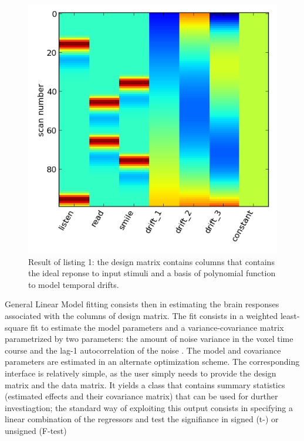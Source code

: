 \documentclass{bioinfo}
\begin{document}
\begin{widetext}

\end{widetext}
\begin{figure}
\includegraphics[width=.9\linewidth]{dmtx.png}
\caption{ Result of listing 1: the design matrix contains columns that
  contains the ideal reponse to input stimuli and a basis of
  polynomial function to model temporal drifts.}
\end{figure}


General Linear Model fitting consists then in estimating the brain
responses associated with the columns of design matrix.
%
The fit consists in a weighted least-square fit to estimate the model
parameters and a variance-covariance matrix parametrized by two
parameters: the amount of noise variance in the voxel time course and
the lag-1 autocorrelation of the noise \cite{Bullmore1996}. 
%
The model and covariance parameters are estimated in an alternate
optimization scheme.
%
The corresponding interface is relatively simple, as the user simply
needs to provide the design matrix and the data matrix. 
%
It yields a class that contains summary statistics (estimated effects
and their covariance matrix) that can be used for durther
investiagtion; the standard way of exploiting this output consists in
specifying a linear combination of the regressors and test the
signifiance in signed (t-) or unsigned (F-test)
%
\end{document}
